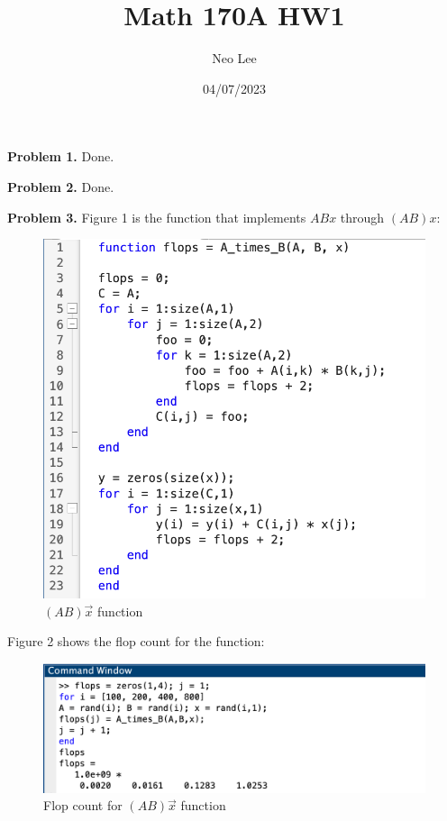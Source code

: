 \documentclass{article}
\title{Math 170A HW1}
\author{Neo Lee}
\date{04/07/2023}
\begin{document}
 

\maketitle 

\textbf{Problem 1.} Done.
\bigbreak

\textbf{Problem 2.} Done.
\bigbreak

\textbf{Problem 3.} 
Figure 1 is the function that implements $ABx$ through $(AB)x$: 
\begin{figure}[h]
    \centering
    \includegraphics[scale = 0.5]{A_times_B_function.png}
    \caption{$(AB)\vec{x}$ function}
\end{figure}

Figure 2 shows the flop count for the function:
\begin{figure}[h]
    \centering
    \includegraphics[scale = 0.5]{A_times_B_flops.png}
    \caption{Flop count for $(AB)\vec{x}$ function}
\end{figure}
\pagebreak
\end{document}

